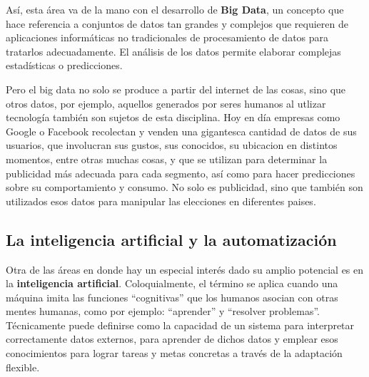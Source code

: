 Así, esta área va de la mano con el desarrollo de \textbf{Big Data}, un concepto
que hace referencia a conjuntos de datos tan grandes y complejos que requieren
de  aplicaciones informáticas no tradicionales de procesamiento de datos para 
tratarlos adecuadamente. El análisis de los datos permite elaborar complejas
estadísticas o predicciones.\autocite[vid.]{warden_2011}

Pero el big data no solo se produce a partir del internet de las cosas, sino que
otros datos, por ejemplo, aquellos generados por seres humanos al utlizar tecnología
también son sujetos de esta disciplina. Hoy en día empresas como Google o Facebook
recolectan y venden una gigantesca cantidad de datos de sus usuarios, que involucran
sus gustos, sus conocidos, su ubicacion en distintos momentos, entre otras muchas
cosas, y que se utilizan para determinar la publicidad más adecuada para cada
segmento, así como para hacer predicciones sobre su comportamiento y consumo.
No solo es publicidad, sino que también son utilizados esos datos para manipular
las elecciones en diferentes paises.\autocite{perfil_2018_03_20}

\subsection{La inteligencia artificial y la automatización}

Otra de las áreas en donde hay un especial interés dado su amplio potencial
es en la \textbf{inteligencia artificial}. Coloquialmente, el término se aplica
cuando una máquina imita las funciones ``cognitivas'' que los humanos asocian
con otras mentes humanas, como por ejemplo: ``aprender'' y ``resolver problemas''.
Técnicamente puede definirse como la capacidad de un sistema para interpretar
correctamente datos externos, para aprender de dichos datos y emplear esos
conocimientos para lograr tareas y metas concretas a través de la adaptación
flexible.\autocite{kaplan_2019}


